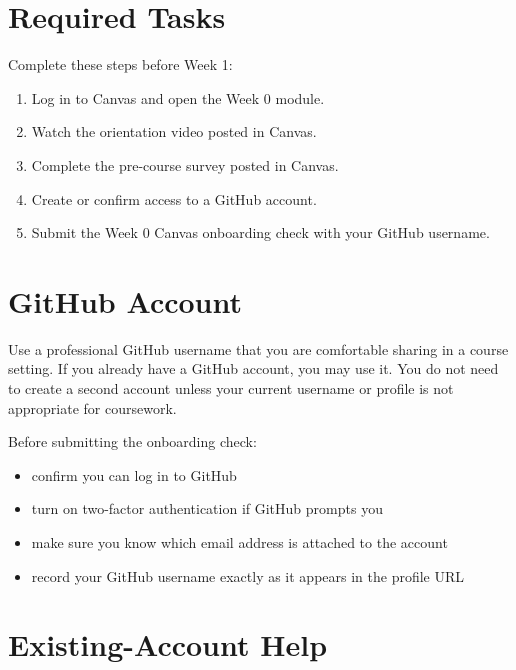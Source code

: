 \documentclass[
  letterpaper,
  DIV=11,
  numbers=noendperiod,
  oneside]{scrreprt}
\providecommand{\tightlist}{%
  \setlength{\itemsep}{0pt}\setlength{\parskip}{0pt}}
\begin{document}
\section*{Required Tasks}\label{required-tasks}


Complete these steps before Week 1:

\begin{enumerate}
\def\labelenumi{\arabic{enumi}.}
\tightlist
\item
  Log in to Canvas and open the Week 0 module.
\item
  Watch the orientation video posted in Canvas.
\item
  Complete the pre-course survey posted in Canvas.
\item
  Create or confirm access to a GitHub account.
\item
  Submit the Week 0 Canvas onboarding check with your GitHub username.
\end{enumerate}

\section*{GitHub Account}\label{github-account}


Use a professional GitHub username that you are comfortable sharing in a
course setting. If you already have a GitHub account, you may use it.
You do not need to create a second account unless your current username
or profile is not appropriate for coursework.

Before submitting the onboarding check:

\begin{itemize}
\tightlist
\item
  confirm you can log in to GitHub
\item
  turn on two-factor authentication if GitHub prompts you
\item
  make sure you know which email address is attached to the account
\item
  record your GitHub username exactly as it appears in the profile URL
\end{itemize}

\section*{Existing-Account Help}\label{existing-account-help}
\end{document}
